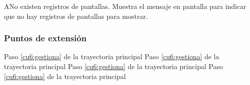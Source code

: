  \begin{UCtrayectoriaA}{A}{No existen registros de pantallas.}
    \UCpaso[\UCsist] Muestra el mensaje  en pantalla  
    para indicar que no hay registros de pantallas para mostrar.
 \end{UCtrayectoriaA}
 

\subsubsection{Puntos de extensión}

	{Paso \ref{cu6:gestiona} de la trayectoria principal}
	{}
	{Paso \ref{cu6:gestiona} de la trayectoria principal}
	{}	
	{Paso \ref{cu6:gestiona} de la trayectoria principal}
	{}
	{Paso \ref{cu6:gestiona} de la trayectoria principal}
	{}